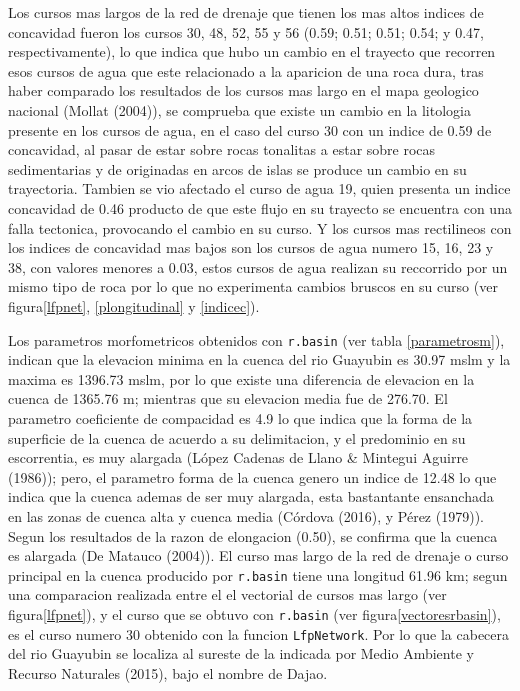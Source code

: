 \documentclass[11pt,]{article}
\begin{document}
Los cursos mas largos de la red de drenaje que tienen los mas altos
indices de concavidad fueron los cursos 30, 48, 52, 55 y 56 (0.59; 0.51;
0.51; 0.54; y 0.47, respectivamente), lo que indica que hubo un cambio
en el trayecto que recorren esos cursos de agua que este relacionado a
la aparicion de una roca dura, tras haber comparado los resultados de
los cursos mas largo en el mapa geologico nacional (Mollat (2004)), se
comprueba que existe un cambio en la litologia presente en los cursos de
agua, en el caso del curso 30 con un indice de 0.59 de concavidad, al
pasar de estar sobre rocas tonalitas a estar sobre rocas sedimentarias y
de originadas en arcos de islas se produce un cambio en su trayectoria.
Tambien se vio afectado el curso de agua 19, quien presenta un indice
concavidad de 0.46 producto de que este flujo en su trayecto se
encuentra con una falla tectonica, provocando el cambio en su curso. Y
los cursos mas rectilineos con los indices de concavidad mas bajos son
los cursos de agua numero 15, 16, 23 y 38, con valores menores a 0.03,
estos cursos de agua realizan su reccorrido por un mismo tipo de roca
por lo que no experimenta cambios bruscos en su curso (ver
figura\ref{lfpnet}, \ref{plongitudinal} y \ref{indicec}).

Los parametros morfometricos obtenidos con \texttt{r.basin} (ver tabla
\ref{parametrosm}), indican que la elevacion minima en la cuenca del rio
Guayubin es 30.97 mslm y la maxima es 1396.73 mslm, por lo que existe
una diferencia de elevacion en la cuenca de 1365.76 m; mientras que su
elevacion media fue de 276.70. El parametro coeficiente de compacidad es
4.9 lo que indica que la forma de la superficie de la cuenca de acuerdo
a su delimitacion, y el predominio en su escorrentia, es muy alargada
(López Cadenas de Llano \& Mintegui Aguirre (1986)); pero, el parametro
forma de la cuenca genero un indice de 12.48 lo que indica que la cuenca
ademas de ser muy alargada, esta bastantante ensanchada en las zonas de
cuenca alta y cuenca media (Córdova (2016), y Pérez (1979)). Segun los
resultados de la razon de elongacion (0.50), se confirma que la cuenca
es alargada (De Matauco (2004)). El curso mas largo de la red de drenaje
o curso principal en la cuenca producido por \texttt{r.basin} tiene una
longitud 61.96 km; segun una comparacion realizada entre el el vectorial
de cursos mas largo (ver figura\ref{lfpnet}), y el curso que se obtuvo
con \texttt{r.basin} (ver figura\ref{vectoresrbasin}), es el curso
numero 30 obtenido con la funcion \texttt{LfpNetwork}. Por lo que la
cabecera del rio Guayubin se localiza al sureste de la indicada por
Medio Ambiente y Recurso Naturales (2015), bajo el nombre de Dajao.
\end{document}
